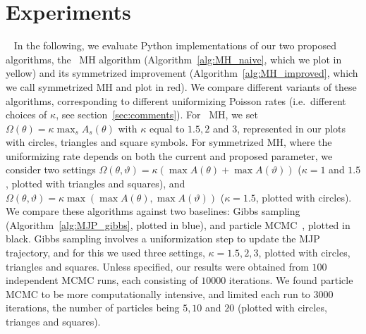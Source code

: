 \vspace{-.2in}
\section{Experiments}\label{sec:expts}~
In the following, we evaluate Python implementations of our two proposed
algorithms, the \naive\ MH algorithm (Algorithm~\ref{alg:MH_naive}, which we
plot in yellow) and its symmetrized improvement (Algorithm~\ref{alg:MH_improved}, 
which we call symmetrized MH and plot in red). We compare 
different variants of these algorithms, corresponding to different 
uniformizing Poisson rates (i.e.\ different choices of $\kappa$, see 
section~\ref{sec:comments}). For \naive\ MH, %
we set $\Omega(\theta) = \kappa \max_s A_s(\theta) $ with $\kappa$  equal to 
$1.5, 2$ and $3$, represented in our plots with circles, triangles and square
symbols. For symmetrized MH, %
where the uniformizing rate depends 
on both the current and proposed parameter, we consider two settings
 $\Omega(\theta, \vartheta) = \kappa (\max A(\theta) + \max A(\vartheta))$ 
 ($\kappa = 1$ and $1.5$, plotted with {triangles} and {squares}), and 
$\Omega(\theta, \vartheta) = \kappa \max(\max A(\theta), \max A(\vartheta))$
($\kappa=1.5$, plotted with {circles}).  We compare these
algorithms against two baselines: Gibbs sampling (Algorithm~\ref{alg:MJP_gibbs},
plotted in blue), and particle MCMC~\cite{Andrieu10}, plotted in black. Gibbs
sampling involves a uniformization step to update the MJP trajectory, and for this
we used three settings, $\kappa=1.5,2,3$, plotted with circles, {triangles}
and {squares}.  Unless specified, our results were
obtained from $100$ independent MCMC runs, each consisting of $10000$ iterations.
We found particle MCMC to be more computationally intensive, and limited each 
run to $3000$ iterations, the number of particles being $5, 10$ and $20$ 
(plotted with circles, trianges and squares). 


